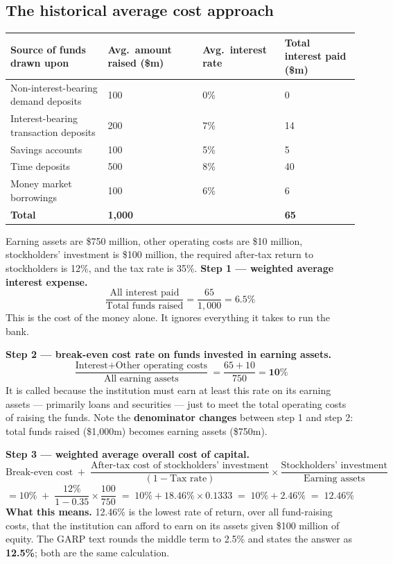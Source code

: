\subsection{The historical average cost approach}

\begin{center}
\small
\begin{tabular}{@{}p{5.6cm} p{3.1cm} p{2.7cm} p{2.9cm}@{}}
\toprule
\rowcolor{FRMSoft}\textbf{Source of funds drawn upon} & \raggedright\textbf{Avg.\ amount raised (\$m)} & \raggedright\textbf{Avg.\ interest rate} & \textbf{Total interest paid (\$m)} \\
\midrule
Non-interest-bearing demand deposits & 100 & 0\% & 0 \\
Interest-bearing transaction deposits & 200 & 7\% & 14 \\
Savings accounts & 100 & 5\% & 5 \\
Time deposits & 500 & 8\% & 40 \\
Money market borrowings & 100 & 6\% & 6 \\
\midrule
\textbf{Total} & \textbf{1,000} & & \textbf{65} \\
\bottomrule
\end{tabular}
\end{center}

\begin{lrexbox}
Earning assets are \$750 million, other operating costs are \$10 million, stockholders' investment is \$100 million, the required after-tax return to stockholders is 12\%, and the tax rate is 35\%.
\tcblower
\textbf{Step 1 --- weighted average interest expense.}
\[ \frac{\text{All interest paid}}{\text{Total funds raised}} = \frac{65}{1{,}000} = \mathbf{6.5\%} \]
This is the cost of the money alone. It ignores everything it takes to run the bank.

\textbf{Step 2 --- break-even cost rate on funds invested in earning assets.}
\[ \frac{\text{Interest} + \text{Other operating costs}}{\text{All earning assets}} = \frac{65 + 10}{750} = \mathbf{10\%} \]
It is called  because the institution must earn at least this rate on its earning assets --- primarily loans and securities --- just to meet the total operating costs of raising the funds. Note the \textbf{denominator changes} between step 1 and step 2: total funds raised (\$1,000m) becomes earning assets (\$750m).

\textbf{Step 3 --- weighted average overall cost of capital.}
\[ \text{Break-even cost} \;+\; \frac{\text{After-tax cost of stockholders' investment}}{(1 - \text{Tax rate})} \times \frac{\text{Stockholders' investment}}{\text{Earning assets}} \]
\[ = 10\% \;+\; \frac{12\%}{1 - 0.35} \times \frac{100}{750} \;=\; 10\% + 18.46\% \times 0.1333 \;=\; 10\% + 2.46\% \;=\; \mathbf{12.46\%} \]
\textbf{What this means.} 12.46\% is the lowest rate of return, over all fund-raising costs, that the institution can afford to earn on its assets given \$100 million of equity. The GARP text rounds the middle term to 2.5\% and states the answer as \textbf{12.5\%}; both are the same calculation.
\end{lrexbox}

